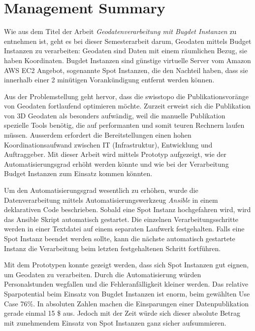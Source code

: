 \section{Management Summary}
Wie aus dem Titel der Arbeit \emph{Geodatenverarbeitung mit Bugdet Instanzen} zu entnehmen ist, geht es bei dieser Semesterarbeit darum, Geodaten mittels Budget Instanzen zu verarbeiten: Geodaten sind Daten mit einem räumlichen Bezug, sie haben Koordinaten. Bugdet Instanzen sind günstige virtuelle Server vom Amazon AWS EC2 Angebot, sogenannte Spot Instanzen, die den Nachteil haben, dass sie innerhalb einer 2 minütigen Vorankündigung entfernt werden können.

Aus der Problemstellung geht hervor, dass die swisstopo die Publikationsvoränge von Geodaten fortlaufend optimieren möchte. Zurzeit erweist sich die Publikation von 3D Geodaten als besonders aufwändig, weil die manuelle Publikation spezielle Tools benötig, die auf performanten und somit teuren Rechnern laufen müssen. Ausserdem erfordert die Bereitstellungen einen hohen Koordinationsaufwand zwischen IT (Infrastruktur), Entwicklung und Auftraggeber.
Mit dieser Arbeit wird mittels Prototyp aufgezeigt, wie der Automatisierungsgrad erhöht werden könnte und wie bei der Verarbeitung Budget Instanzen zum Einsatz kommen könnten.

Um den Automatisierungsgrad wesentlich zu erhöhen, wurde die Datenverarbeitung mittels Automatisierungswerkzeug \emph{Ansible} in einem deklarativen Code beschrieben. Sobald eine Spot Instanz hochgefahren wird, wird das Ansible Skript automatisch gestartet.
Die einzelnen Verarbeitungsschritte werden in einer Textdatei auf einem separaten Laufwerk festgehalten. Falls eine Spot Instanz beendet werden sollte, kann die nächste automatisch gestartete Instanz die Verarbeitung beim letzten festgehaltenen Schritt fortführen.

Mit dem Prototypen konnte gezeigt werden, dass sich Spot Instanzen gut eignen, um Geodaten zu verarbeiten. Durch die Automatisierung würden Personalstunden wegfallen und die Fehleranfälligkeit kleiner werden.
Das relative Sparpotential beim Einsatz von Bugdet Instanzen ist enorm, beim gewählten Use Case 76\%. In absoluten Zahlen machen die Einsparungen einer Datenpublikation gerade einmal 15 \$ aus. Jedoch mit der Zeit würde sich dieser absolute Betrag mit zunehmendem Einsatz von Spot Instanzen ganz sicher aufsummieren.


\pagebreak
